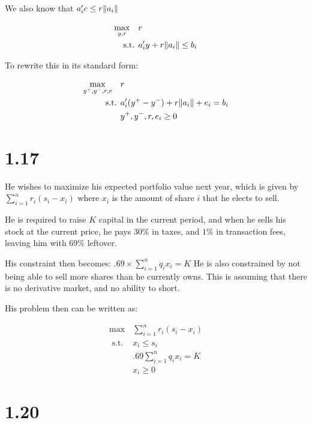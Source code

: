 \documentclass[12pt]{paper}
\DeclarePairedDelimiter{\norm}{\lVert}{\rVert}
\begin{document}
We also know that $a_i'c \leq r \norm{a_i}$

\begin{align*}
  \max_{y,r} \quad &r\\
  \text{ s.t. } & a_i' y + r \norm{a_i} \leq b_i
\end{align*}

To rewrite this in its standard form:

\begin{align*}
  \max_{y^+,y^-,r,e} \quad&r\\
  \text{ s.t. } & a_i' (y^+ - y^-) + r \norm{a_i} + e_i = b_i\\
                     & y^+, y^-, r, e_i \geq 0  
\end{align*}

\section{1.17}

He wishes to maximize his expected portfolio value next year, which is
given by $\sum_{i=1}^n r_i (s_i - x_i)$ where $x_i$ is the amount of
share $i$ that he elects to sell.

He is required to raise $K$ capital in the current period, and when he
sells his stock at the current price, he pays $30\%$ in taxes, and
$1\%$ in transaction fees, leaving him with $69\%$ leftover.

His constraint then becomes: $.69 \times \sum_{i=1}^n q_i x_i = K$
He is also constrained by not being able to sell more shares than he
currently owns. This is assuming that there is no derivative market,
and no ability to short.

His problem then can be written as:

\begin{align*}
  \max &\sum_{i=1}^n r_i (s_i -x_i)\\
  \text{ s.t. } & x_i \leq s_i\\
       & .69 \sum_{i=1}^nq_i x_i = K\\
  &x_i \geq 0  
\end{align*}

\section{1.20}
\end{document}
